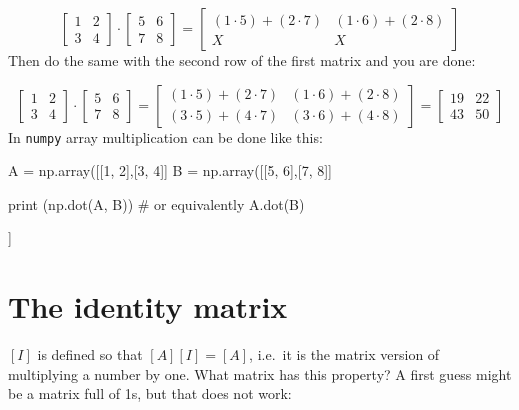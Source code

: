 \begin{equation*} 
\begin{bmatrix}
1 & 2 \\
3 & 4
\end{bmatrix}
\cdot
\begin{bmatrix}
5 & 6 \\
7 & 8
\end{bmatrix}
=
\begin{bmatrix}
(1\cdot 5) + (2\cdot 7) & (1\cdot 6) + (2\cdot 8)  \\
X & X
\end{bmatrix}
\end{equation*}
Then do the same with the second row of the first matrix and you are done:

\begin{equation*} 
\begin{bmatrix}
1 & 2 \\
3 & 4
\end{bmatrix}
\cdot
\begin{bmatrix}
5 & 6 \\
7 & 8
\end{bmatrix}
=
\begin{bmatrix}
(1\cdot 5) + (2\cdot 7) & (1\cdot 6) + (2\cdot 8)  \\
(3\cdot 5) + (4\cdot 7) & (3\cdot 6) + (4\cdot 8) 
\end{bmatrix}
=
\begin{bmatrix}
19 & 22 \\
43 & 50 
\end{bmatrix}
\end{equation*}
In \texttt{numpy} array multiplication can be done like this:

\begin{ipythonnon}
A = np.array([[1, 2],[3, 4]]
B = np.array([[5, 6],[7, 8]]
	
print (np.dot(A, B))
# or equivalently A.dot(B)
\end{ipythonnon}
\begin{ioutput}
[[19 22]
 [43 50]]
\end{ioutput}

\section{The identity matrix}
\label{the-identity-matrix}

$[I]$ is defined so that $[A][I]=[A]$, i.e.~it is the matrix version of multiplying a number by one. What matrix has this property? A first guess might be a matrix full of 1s, but that does not work:

